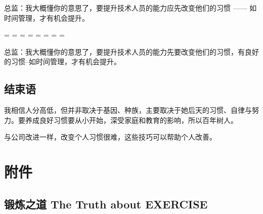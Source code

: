 总监：我大概懂你的意思了，要提升技术人员的能力应先改变他们的习惯 —— 如时间管理，才有机会提升。\\

\begin{description}
\tightlist
\item[]
= = = = = = = =
\end{description}

总监：我大概懂你的意思了，要提升技术人员的能力先要改变他们的习惯，有良好的习惯--如时间管理，才有机会提升。\\


\hypertarget{ux7ed3ux675fux8bed}{%
\subsection{结束语}\label{ux7ed3ux675fux8bed}}


我相信人分高低，但并非取决于基因、种族，主要取决于她后天的习惯、自律与努力。要养成良好习惯要从小开始，深受家庭和教育的影响，所以百年树人。

与公司改进一样，改变个人习惯很难，这些技巧可以帮助个人改善。

\hypertarget{ux9644ux4ef6}{%
\section{附件}\label{ux9644ux4ef6}}


\hypertarget{ux953bux70bcux4e4bux9053-the-truth-about-exercise}{%
\subsection{锻炼之道 The Truth about
EXERCISE}\label{ux953bux70bcux4e4bux9053-the-truth-about-exercise}}

